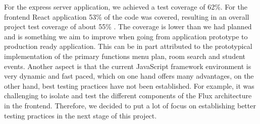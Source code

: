 \begin{markdown}
For the express server application, we achieved a test coverage of 62\%. For the frontend React application 53\% of the code was covered, resulting in an overall project test coverage of about 55\% \cite{OurCoverage}. The coverage is lower than we had planned and is something we aim to improve when going from application prototype to production ready application. This can be in part attributed to the prototypical implementation of the primary functions menu plan, room search and student events. Another aspect is that the current JavaScript framework environment is very dynamic and fast paced, which on one hand offers many advantages, on the other hand, best testing practices have not been established. For example, it was challenging to isolate and test the different components of the Flux architecture in the frontend. Therefore, we decided to put a lot of focus on establishing better testing practices in the next stage of this project.

\end{markdown}


